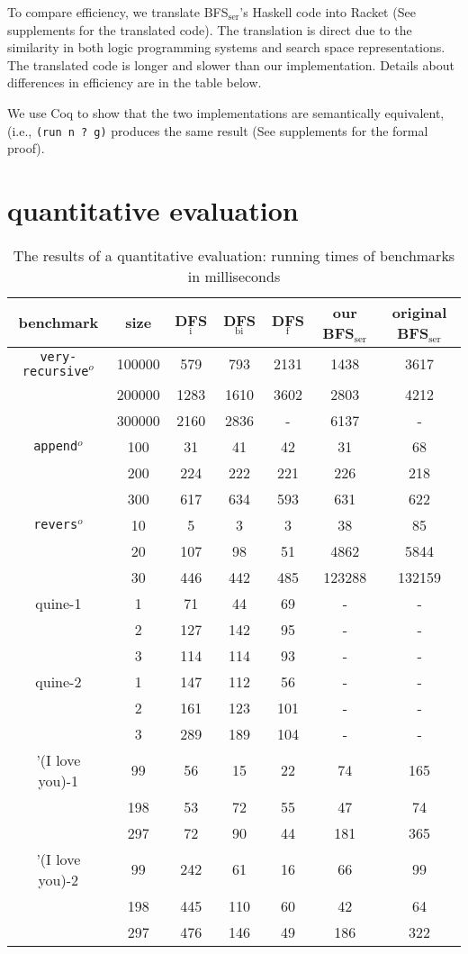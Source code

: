 \documentclass[format=acmlarge, review=true, authordraft=true]{acmart}
\newcommand{\veryrecursiveo}{\texttt{very-recursive$^o$}}
\newcommand{\appendo}{\texttt{append$^o$}}
\newcommand{\reverso}{\texttt{revers$^o$}}
\newcommand{\DFSi }[0]{DFS$_\textrm{i}$}
\newcommand{\DFSf }[0]{DFS$_\textrm{f}$}
\newcommand{\DFSbi}[0]{DFS$_\textrm{bi}$}
\newcommand{\BFSser}[0]{BFS$_\textrm{ser}$}
\begin{document}
To compare efficiency, we translate \BFSser{}'s Haskell code into Racket (See supplements for the translated code). The translation is direct 
due to the similarity in both logic programming systems and search space 
representations. The translated code is longer and slower than our 
implementation. Details about differences in efficiency are in the table below.

We use Coq to show that the two implementations are 
semantically equivalent, (i.e., \texttt{(run n ? g)} 
produces the same result (See supplements for the formal proof).

\section{quantitative evaluation}

\begin{table}
	\begin{tabular}{|c|c|c|c|c|c|c|}
		\hline 
		benchmark & size & \DFSi{} & \DFSbi{} & \DFSf{} & 
		our \BFSser{} & original \BFSser{}  
		\\
		\hline
		\veryrecursiveo & 100000 &  579 &  793 & 2131 & 1438 & 3617 \\
		& 200000 & 1283 & 1610 & 3602 & 2803 & 4212 \\
		& 300000 & 2160 & 2836 &    - & 6137 &    - \\
		\hline 
		\appendo  & 100 &  31 &  41 &  42 &  31 &  68 \\ 
		& 200 & 224 & 222 & 221 & 226 & 218 \\ 
		& 300 & 617 & 634 & 593 & 631 & 622 \\ 
		\hline 
		\reverso & 10 &   5 &   3 &   3 &     38 &     85 \\ 
		& 20 & 107 &  98 &  51 &   4862 &   5844 \\
		& 30 & 446 & 442 & 485 & 123288 & 132159 \\ 
		\hline
		quine-1 & 1 &  71 &  44 & 69 & - & - \\ 
		& 2 & 127 & 142 & 95 & - & - \\ 
		& 3 & 114 & 114 & 93 & - & - \\ 
		\hline
		quine-2 & 1 & 147 & 112 &  56 & - & - \\ 
		& 2 & 161 & 123 & 101 & - & - \\ 
		& 3 & 289 & 189 & 104 & - & - \\ 
		\hline 
		'(I love you)-1 &  99 & 56 & 15 & 22 &  74 & 165 \\ 
		& 198 & 53 & 72 & 55 &  47 &  74 \\
		& 297 & 72 & 90 & 44 & 181 & 365 \\ 
		\hline
		'(I love you)-2 &  99 & 242 &  61 & 16 &  66 &  99 \\ 
		& 198 & 445 & 110 & 60 &  42 &  64 \\
		& 297 & 476 & 146 & 49 & 186 & 322 \\ 
		\hline 
	\end{tabular}
	\caption{The results of a quantitative evaluation: running times of 
	benchmarks 
		in milliseconds}
	\label{compare-efficiency}
\end{table}
\end{document}
